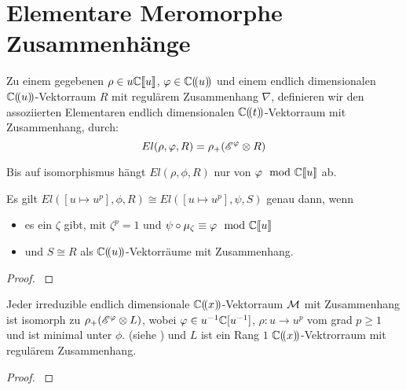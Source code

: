 \chapter{Elementare Meromorphe Zusammenhänge}

\begin{defn}
\cite[Def 2.1]{sabbah_Fourier-local}
\begin{comment}
Alternative. ausfürlichere / komplexe definition \cite[Def 5.4.5.]{sabbah_cimpa90}
\end{comment}
Zu einem gegebenen $\rho\in u\mathbb{C}\llbracket u\rrbracket$,
$\varphi\in\mathbb{C}(\!(u)\!)$ und einem endlich dimensionalen
$\mathbb{C}(\!(u)\!)$-Vektorraum $R$ mit regulärem Zusammenhang $\nabla$,
definieren wir den assoziierten Elementaren endlich dimensionalen
$\mathbb{C}(\!(t)\!)$-Vektorraum mit Zusammenhang, durch:
\[
El(\rho,\varphi,R)=\rho_+(\mathscr{E}^\varphi\otimes R)
\]
\end{defn}
\cite[nach Def 2.1]{sabbah_Fourier-local}
Bis auf isomorphismus hängt $El(\rho,\phi,R)$ nur von $\varphi\mod{{\mathbb C\llbracket u\rrbracket}}$ ab.
\begin{lem}
\cite[Lem 2.2]{sabbah_Fourier-local}
\end{lem}



\begin{lem} \cite[Lem 2.6.]{sabbah_Fourier-local}
Es gilt $El([u\mapsto u^p],\phi,R)\cong El([u\mapsto u^p],\psi,S)$ genau dann,
wenn
\begin{itemize}
\item es ein $\zeta$ gibt, mit $\zeta^p=1$ und
$\psi\circ\mu_\zeta\equiv\varphi\mod{{\mathbb C\llbracket u\rrbracket}}$
\item und $S\cong R$ als ${\mathbb C (\!(u)\!)}$-Vektorräume mit Zusammenhang.
\end{itemize}
\end{lem}
\begin{proof}
\cite[Lem 2.6.]{sabbah_Fourier-local}
\end{proof}

\begin{prop} \cite[Prop 3.1]{sabbah_Fourier-local}
Jeder irreduzible endlich dimensionale ${\mathbb C (\!(x)\!)}$-Vektorraum $\mathcal{M}$ mit
Zusammenhang ist isomorph zu $\rho_+(\mathscr{E}^\varphi\otimes L)$, wobei $\varphi\in
u^{-1}\mathbb{C}[u^{-1}]$, $\rho:u\rightarrow u^p$ vom grad $p\geq 1$ und ist minimal
unter $\phi$. (siehe \cite[Rem  2.8]{sabbah_Fourier-local}) und $L$ ist ein
Rang $1$ ${\mathbb C (\!(x)\!)}$-Vektrorraum mit regulärem Zusammenhang.
\end{prop}
\begin{proof}
\cite[Prop 3.1]{sabbah_Fourier-local}
\end{proof}

